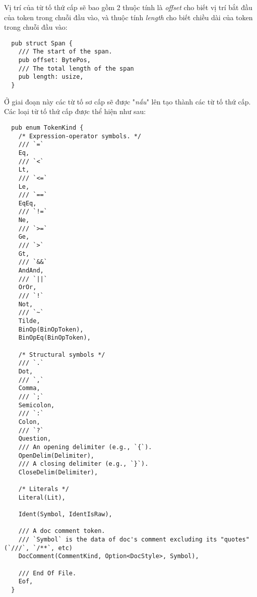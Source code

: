 Vị trí của từ tố thứ cấp sẽ bao gồm 2 thuộc tính là \textit{offset} cho biết vị trí bắt đầu của token trong chuỗi đầu vào, và thuộc tính \textit{length} cho biết chiều dài của token trong chuỗi đầu vào:
\begin{lstlisting}
  pub struct Span {
    /// The start of the span.
    pub offset: BytePos,
    /// The total length of the span
    pub length: usize,
  }
\end{lstlisting}

Ở giai đoạn này các từ tố sơ cấp sẽ được "\textit{nấu}" lên tạo thành các từ tố thứ cấp. Các loại từ tố thứ cấp được thể hiện như sau:
\begin{lstlisting}
  pub enum TokenKind {
    /* Expression-operator symbols. */
    /// `=`
    Eq,
    /// `<`
    Lt,
    /// `<=`
    Le,
    /// `==`
    EqEq,
    /// `!=`
    Ne,
    /// `>=`
    Ge,
    /// `>`
    Gt,
    /// `&&`
    AndAnd,
    /// `||`
    OrOr,
    /// `!`
    Not,
    /// `~`
    Tilde,
    BinOp(BinOpToken),
    BinOpEq(BinOpToken),

    /* Structural symbols */
    /// `.`
    Dot,
    /// `,`
    Comma,
    /// `;`
    Semicolon,
    /// `:`
    Colon,
    /// `?`
    Question,
    /// An opening delimiter (e.g., `{`).
    OpenDelim(Delimiter),
    /// A closing delimiter (e.g., `}`).
    CloseDelim(Delimiter),

    /* Literals */
    Literal(Lit),

    Ident(Symbol, IdentIsRaw),

    /// A doc comment token.
    /// `Symbol` is the data of doc's comment excluding its "quotes" (`///`, `/**`, etc)
    DocComment(CommentKind, Option<DocStyle>, Symbol),

    /// End Of File.
    Eof,
  }
\end{lstlisting} 


